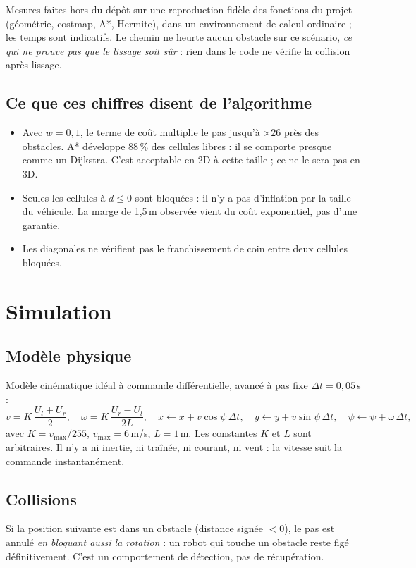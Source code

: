 \documentclass[11pt,a4paper]{article}
\begin{document}
\begin{note}
Mesures faites hors du dépôt sur une reproduction fidèle des fonctions du projet (géométrie, costmap, A*, Hermite),
dans un environnement de calcul ordinaire ; les temps sont indicatifs. Le chemin ne heurte aucun obstacle sur ce scénario,
\emph{ce qui ne prouve pas que le lissage soit sûr} : rien dans le code ne vérifie la collision après lissage.
\end{note}

\subsection{Ce que ces chiffres disent de l'algorithme}
\begin{itemize}
\item Avec $w=0{,}1$, le terme de coût multiplie le pas jusqu'à $\times26$ près des obstacles. A* développe 88\,\% des cellules libres :
il se comporte presque comme un Dijkstra. C'est acceptable en 2D à cette taille ; ce ne le sera pas en 3D.
\item Seules les cellules à $d\le0$ sont bloquées : il n'y a pas d'inflation par la taille du véhicule. La marge de 1,5\,m observée
vient du coût exponentiel, pas d'une garantie.
\item Les diagonales ne vérifient pas le franchissement de coin entre deux cellules bloquées.
\end{itemize}

\section{Simulation}
\subsection{Modèle physique}
Modèle cinématique idéal à commande différentielle, avancé à pas fixe $\Delta t=0{,}05$\,s :
\[
v=K\,\frac{U_l+U_r}{2},\quad \omega=K\,\frac{U_r-U_l}{2L},\quad
x\leftarrow x+v\cos\psi\,\Delta t,\quad y\leftarrow y+v\sin\psi\,\Delta t,\quad \psi\leftarrow\psi+\omega\,\Delta t,
\]
avec $K=v_{\max}/255$, $v_{\max}=6$\,m/s, $L=1$\,m. Les constantes $K$ et $L$ sont arbitraires.
Il n'y a ni inertie, ni traînée, ni courant, ni vent : la vitesse suit la commande instantanément.

\subsection{Collisions}
Si la position suivante est dans un obstacle (distance signée $<0$), le pas est annulé \emph{en bloquant aussi la rotation} :
un robot qui touche un obstacle reste figé définitivement. C'est un comportement de détection, pas de récupération.
\end{document}
